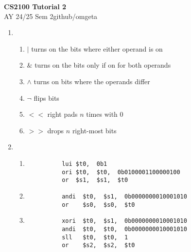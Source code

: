 \documentclass[12pt, a4paper]{article}
\newcommand{\mytitle}{CS2100 Tutorial 2}
\newcommand{\myauthor}{github/omgeta}
\newcommand{\mydate}{AY 24/25 Sem 2}
\begin{document}
\raggedright
\footnotesize
\begin{center}
{\normalsize{\textbf{\mytitle}}} \\
{\footnotesize{\mydate\hspace{2pt}\textemdash\hspace{2pt}\myauthor}}
\end{center}
\begin{enumerate}[Q\arabic*.]
  \item 
    \begin{enumerate}[\alph*.]
      \item $|$ turns on the bits where either operand is on
      \item $\&$ turns on the bits only if on for both operands
      \item $\land$ turns on bits where the operands differ
      \item $\neg$ flips bits
      \item $<<$ right pads $n$ times with 0
      \item $>>$ drops $n$ right-most bits
    \end{enumerate}

  \item \hfill 
    \begin{enumerate}[\alph*.]
      \item 
        \begin{lstlisting}
          lui $t0,  0b1
          ori $t0,  $t0,  0b0100001100000100
          or  $s1,  $s1,  $t0
        \end{lstlisting}
      \hfill
      \item 
        \begin{lstlisting}
          andi  $t0,  $s1,  0b0000000010001010
          or    $s0,  $s0,  $t0  
        \end{lstlisting}
        \hfill
      \item 
        \begin{lstlisting}
          xori  $t0,  $s1,  0b0000000010001010
          andi  $t0,  $t0,  0b0000000010001010
          sll   $t0,  $t0,  1
          or    $s2,  $s2,  $t0
        \end{lstlisting}
    \end{enumerate}


\end{enumerate}
\end{document}
